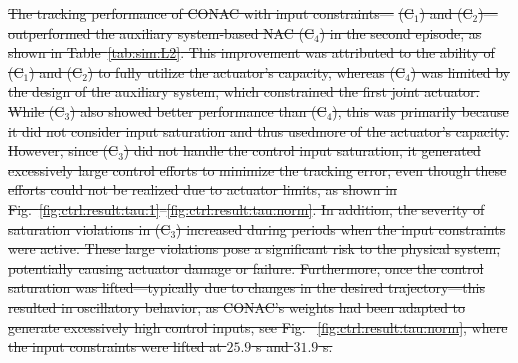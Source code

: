 \documentclass[letterpaper, journal]{IEEEtran}
\providecommand{\DIFdel}[1]{{\protect\color{red}\sout{#1}}} %
\providecommand{\DIFaddbegin}{} %
\providecommand{\DIFaddend}{} %
\providecommand{\DIFdelend}{} %
\begin{document}
\DIFdel{The tracking performance of CONAC with input constraints—}%
\DIFdel{(C$_1$) and (C$_2$)—outperformed the auxiliary system-based NAC (C$_4$) in the second episode, as shown in Table~\ref{tab:sim:L2}.
This improvement was attributed to the ability of (C$_1$) and (C$_2$) to fully utilize the actuator's capacity, whereas (C$_4$) was limited by the design of the auxiliary system, which constrained the first joint actuator.
While (C$_3$) also showed better performance than (C$_4$), this was primarily because it did not consider input saturation and thus usedmore of the actuator's capacity.
However, since (C$_3$) did not handle the control input saturation, it generated excessively large control efforts to minimize the tracking error, even though these efforts could not be realized due to actuator limits, as shown in Fig.~\ref{fig:ctrl:result:tau:1}–\ref{fig:ctrl:result:tau:norm}.
In addition, the severity of saturation violations in (C$_3$) increased during periods when the input constraints were active. 
These large violations pose a significant risk to the physical system, potentially causing actuator damage or failure. 
Furthermore, once the control saturation was lifted—typically due to changes in the desired trajectory—this resulted in oscillatory behavior, as CONAC's weights had been adapted to generate excessively high control inputs, see Fig. 
~\ref{fig:ctrl:result:tau:norm}, where the input constraints were lifted at $25.9$ s and $31.9$ s.
}\DIFdelend \DIFaddbegin {}
\DIFaddend 
\end{document}
